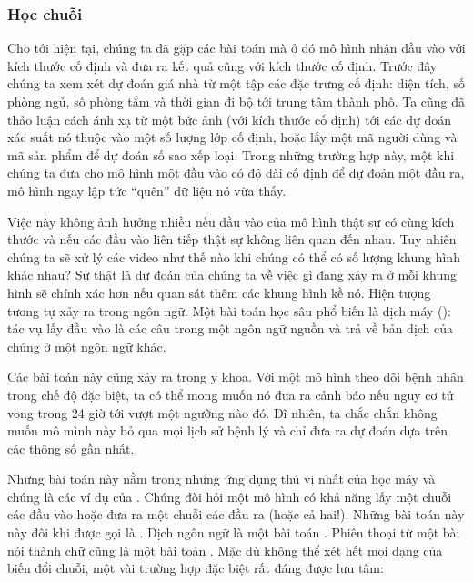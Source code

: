 \documentclass[letterpaper,11pt,english]{sphinxmanual}
\begin{document}
\subsubsection{Học chuỗi}
\label{\detokenize{chapter_introduction/index_vn:hoc-chuoi}}




Cho tới hiện tại, chúng ta đã gặp các bài toán mà ở đó mô hình nhận đầu
vào với kích thước cố định và đưa ra kết quả cũng với kích thước cố
định. Trước đây chúng ta xem xét dự đoán giá nhà từ một tập các đặc
trưng cố định: diện tích, số phòng ngủ, số phòng tắm và thời gian đi bộ
tới trung tâm thành phố. Ta cũng đã thảo luận cách ánh xạ từ một bức ảnh
(với kích thước cố định) tới các dự đoán xác suất nó thuộc vào một số
lượng lớp cố định, hoặc lấy một mã người dùng và mã sản phẩm để dự đoán
số sao xếp loại. Trong những trường hợp này, một khi chúng ta đưa cho mô
hình một đầu vào có độ dài cố định để dự đoán một đầu ra, mô hình ngay
lập tức “quên” dữ liệu nó vừa thấy.



Việc này không ảnh hưởng nhiều nếu đầu vào của mô hình thật sự có cùng
kích thước và nếu các đầu vào liên tiếp thật sự không liên quan đến
nhau. Tuy nhiên chúng ta sẽ xử lý các video như thế nào khi chúng có thể
có số lượng khung hình khác nhau? Sự thật là dự đoán của chúng ta về
việc gì đang xảy ra ở mỗi khung hình sẽ chính xác hơn nếu quan sát thêm
các khung hình kề nó. Hiện tượng tương tự xảy ra trong ngôn ngữ. Một bài
toán học sâu phổ biến là dịch máy (): tác vụ lấy
đầu vào là các câu trong một ngôn ngữ nguồn và trả về bản dịch của chúng
ở một ngôn ngữ khác.



Các bài toán này cũng xảy ra trong y khoa. Với một mô hình theo dõi bệnh
nhân trong chế độ đặc biệt, ta có thể mong muốn nó đưa ra cảnh báo nếu
nguy cơ tử vong trong 24 giờ tới vượt một ngưỡng nào đó. Dĩ nhiên, ta
chắc chắn không muốn mô mình này bỏ qua mọi lịch sử bệnh lý và chỉ đưa
ra dự đoán dựa trên các thông số gần nhất.



Những bài toán này nằm trong những ứng dụng thú vị nhất của học máy và
chúng là các ví dụ của . Chúng đòi hỏi một mô hình có khả
năng lấy một chuỗi các đầu vào hoặc đưa ra một chuỗi các đầu ra (hoặc cả
hai!). Những bài toán này này đôi khi được gọi là . Dịch ngôn
ngữ là một bài toán . Phiên thoại từ một bài nói thành chữ
cũng là một bài toán . Mặc dù không thể xét hết mọi dạng của
biến đổi chuỗi, một vài trường hợp đặc biệt rất đáng được lưu tâm:
\end{document}
